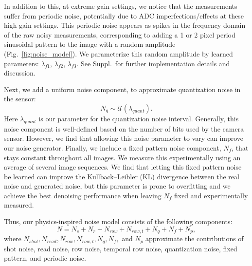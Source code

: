 \documentclass[final]{cvpr}
\begin{document}
In addition to this, at extreme gain settings, we notice that the measurements suffer from periodic noise, potentially due to ADC imperfections/effects at these high gain settings. This periodic noise appears as spikes in the frequency domain of the raw noisy measurements, corresponding to adding a 1 or 2 pixel period sinusoidal pattern to the image with a random amplitude (Fig.~\ref{fig:noise_model}). We parameterize this random amplitude by learned parameters: $\lambda_{f1}$, $\lambda_{f2}$, $\lambda_{f3}$. See Suppl.\ for further implementation details and discussion. 



Next, we add a uniform noise component, to approximate quantization noise in the sensor:
\begin{equation}
N_{q} \sim \mathcal{U}(\lambda_{quant}).
\end{equation}
Here $\lambda_{quant}$ is our parameter for the quantization noise interval. Generally, this noise component is well-defined based on the number of bits used by the camera sensor. However, we find that allowing this noise parameter to vary can improve our noise generator. Finally, we include a fixed pattern noise component, $N_{f}$, that stays constant throughout all images. We measure this experimentally using an average of several image sequences. We find that letting this fixed pattern noise be learned can improve the Kullback–Leibler (KL) divergence between the real noise and generated noise, but this parameter is prone to overfitting and we achieve the best denoising performance when leaving $N_{f}$ fixed and experimentally measured. 

Thus, our physics-inspired noise model consists of the following components:
\begin{equation}
    N = N_{s} + N_{r} + N_{row} + N_{row,t} + N_{q} + N_{f} + N_{p},
\end{equation}
where $N_{shot}, N_{read}, N_{row}, N_{row,t}, N_{q}, N_{f},$ and $N_{p}$ approximate the contributions of shot noise, read noise, row noise, temporal row noise, quantization noise, fixed pattern, and periodic noise.
\end{document}
